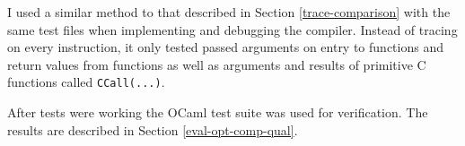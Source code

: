 I used a similar method to that described in Section \ref{trace-comparison} with the same test
files
when implementing and debugging the compiler. Instead of tracing on every instruction, it only
tested
passed arguments on entry to functions and return values from functions as well as arguments and
results of
primitive C functions called \texttt{CCall(...)}.

After tests were working the OCaml test suite was used for verification. The results are described
in Section
\ref{eval-opt-comp-qual}.

% 
% 
% 

